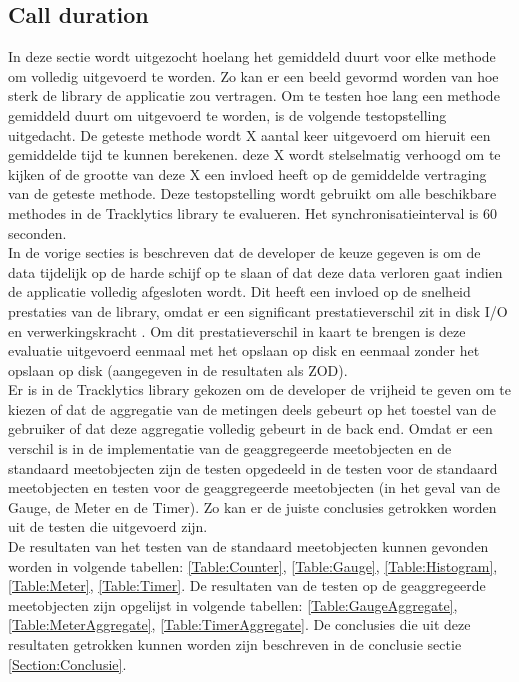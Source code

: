 \subsection{Call duration}
In deze sectie wordt uitgezocht hoelang het gemiddeld duurt voor elke methode om volledig uitgevoerd te worden. Zo kan er een beeld gevormd worden van hoe sterk de library de applicatie zou vertragen. Om te testen hoe lang een methode gemiddeld duurt om uitgevoerd te worden, is de volgende testopstelling uitgedacht. De geteste methode wordt X aantal keer uitgevoerd om hieruit een gemiddelde tijd te kunnen berekenen. deze X wordt stelselmatig verhoogd om te kijken of de grootte van deze X een invloed heeft op de gemiddelde vertraging van de geteste methode. Deze testopstelling wordt gebruikt om alle beschikbare methodes in de Tracklytics library te evalueren. Het synchronisatieinterval is 60 seconden. \\

In de vorige secties is beschreven dat de developer de keuze gegeven is om de data tijdelijk op de harde schijf op te slaan of dat deze data verloren gaat indien de applicatie volledig afgesloten wordt. Dit heeft een invloed op de snelheid prestaties van de library, omdat er een significant prestatieverschil zit in disk I/O en verwerkingskracht \cite{diskIO}. Om dit prestatieverschil in kaart te brengen is deze evaluatie uitgevoerd eenmaal met het opslaan op disk en eenmaal zonder het opslaan op disk (aangegeven in de resultaten als ZOD).\\

Er is in de Tracklytics library gekozen om de developer de vrijheid te geven om te kiezen of dat de aggregatie van de metingen deels gebeurt op het toestel van de gebruiker of dat deze aggregatie volledig gebeurt in de back end. Omdat er een verschil is in de implementatie van de geaggregeerde meetobjecten en de standaard meetobjecten zijn de testen opgedeeld in de testen voor de standaard meetobjecten en testen voor de geaggregeerde meetobjecten (in het geval van de Gauge, de Meter en de Timer). Zo kan er de juiste conclusies getrokken worden uit de testen die uitgevoerd zijn.\\


De resultaten van het testen van de standaard meetobjecten kunnen gevonden worden in volgende tabellen: \ref{Table:Counter}, \ref{Table:Gauge}, \ref{Table:Histogram}, \ref{Table:Meter}, \ref{Table:Timer}. De resultaten van de testen op de geaggregeerde meetobjecten zijn opgelijst in volgende tabellen: \ref{Table:GaugeAggregate}, \ref{Table:MeterAggregate}, \ref{Table:TimerAggregate}. De conclusies die uit deze resultaten getrokken kunnen worden zijn beschreven in de conclusie sectie \ref{Section:Conclusie}.


